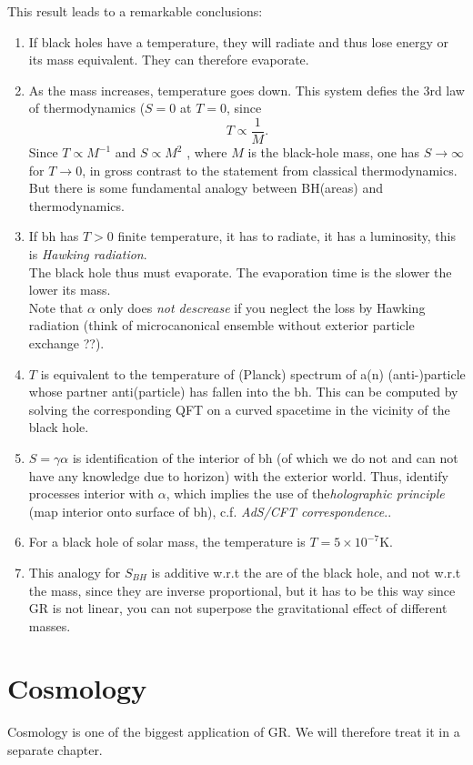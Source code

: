 	This result leads to a remarkable conclusions:
	\begin{enumerate}
		\item  If black holes have a
	temperature, they will radiate and thus lose energy or its mass equivalent. They can therefore evaporate.
	
	\item As the mass increases, temperature goes down. This system defies the 3rd law of thermodynamics ($S=0$ at $T=0$, since
	\begin{equation}
		T \propto \frac{1}{M}.
	\end{equation}
	Since $T ∝ M^{−1}$ and $S ∝ M^2$ , where $M$ is the black-hole mass, one has $S → ∞$ for $T → 0$, in
	gross contrast to the statement from classical thermodynamics.\\
	But there is some fundamental analogy between BH(areas) and thermodynamics.
	\item If bh has $T>0$ finite temperature, it has to radiate, it has a luminosity, this is  \emph{Hawking radiation}.\\
	The black hole thus must evaporate. The evaporation time is the slower the lower its mass.\\
	Note that $\alpha$ only does \emph{not descrease} if you neglect the loss by Hawking radiation (think of microcanonical ensemble without exterior particle exchange ??).
	
	\item $T$ is equivalent to the temperature of (Planck) spectrum of a(n) (anti-)particle whose partner anti(particle) has fallen into the bh. This can be computed by solving the corresponding QFT on a curved spacetime in the vicinity of the black hole.
	\item $S=\gamma \alpha$ is identification of the interior of bh (of which we do not and can not have any knowledge due to horizon) with the exterior world. Thus, identify processes interior with $\alpha$, which implies the use of the\emph{holographic principle} (map interior onto surface of bh), c.f. \emph{AdS/CFT correspondence}..
	 \item For a black hole of solar mass, the temperature is $T=5\times 10^{-7} \mathrm{K}$.
	 \item This analogy for $S_{BH}$ is additive w.r.t the are of the black hole, and not w.r.t the mass, since they are inverse proportional, but it has to be this way since GR is not linear, you can not superpose the gravitational effect of different masses.
\end{enumerate}
	
	
	
	
	
\section{Cosmology}
Cosmology is one of the biggest application of GR. We will therefore treat it in a separate chapter.
